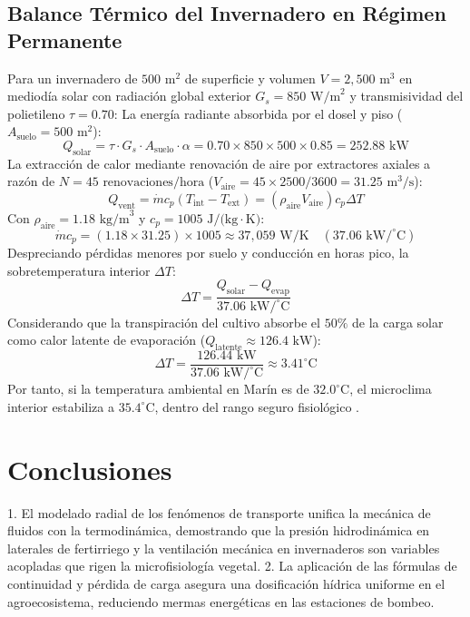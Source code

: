 \documentclass[12pt,spanish,letterpaper,oneside]{article}
\begin{document}
\subsection{Balance Térmico del Invernadero en Régimen Permanente}
Para un invernadero de $500\text{ m}^2$ de superficie y volumen $V = 2,500\text{ m}^3$ en mediodía solar con radiación global exterior $G_s = 850\text{ W/m}^2$ y transmisividad del polietileno $\tau = 0.70$:
La energía radiante absorbida por el dosel y piso ($A_{\text{suelo}} = 500\text{ m}^2$):
\begin{equation}
    Q_{\text{solar}} = \tau \cdot G_s \cdot A_{\text{suelo}} \cdot \alpha = 0.70 \times 850 \times 500 \times 0.85 = 252.88\text{ kW}
\end{equation}
La extracción de calor mediante renovación de aire por extractores axiales a razón de $N = 45\text{ renovaciones/hora}$ ($V_{\text{aire}} = 45 \times 2500 / 3600 = 31.25\text{ m}^3\text{/s}$):
\begin{equation}
    Q_{\text{vent}} = \dot{m} c_p (T_{\text{int}} - T_{\text{ext}}) = (\rho_{\text{aire}} V_{\text{aire}}) c_p \Delta T
\end{equation}
Con $\rho_{\text{aire}} = 1.18\text{ kg/m}^3$ y $c_p = 1005\text{ J/(kg}\cdot\text{K)}$:
\begin{equation}
    \dot{m} c_p = (1.18 \times 31.25) \times 1005 \approx 37,059\text{ W/K} \quad (37.06\text{ kW/}^\circ\text{C})
\end{equation}
Despreciando pérdidas menores por suelo y conducción en horas pico, la sobretemperatura interior $\Delta T$:
\begin{equation}
    \Delta T = \frac{Q_{\text{solar}} - Q_{\text{evap}}}{37.06\text{ kW/}^\circ\text{C}}
\end{equation}
Considerando que la transpiración del cultivo absorbe el $50\%$ de la carga solar como calor latente de evaporación ($Q_{\text{latente}} \approx 126.4\text{ kW}$):
\begin{equation}
    \Delta T = \frac{126.44\text{ kW}}{37.06\text{ kW/}^\circ\text{C}} \approx 3.41^\circ\text{C}
\end{equation}
Por tanto, si la temperatura ambiental en Marín es de $32.0^\circ\text{C}$, el microclima interior estabiliza a $35.4^\circ\text{C}$, dentro del rango seguro fisiológico \parencite{tipler2010}.

\section{Conclusiones}
1. El modelado radial de los fenómenos de transporte unifica la mecánica de fluidos con la termodinámica, demostrando que la presión hidrodinámica en laterales de fertirriego y la ventilación mecánica en invernaderos son variables acopladas que rigen la microfisiología vegetal.
2. La aplicación de las fórmulas de continuidad y pérdida de carga asegura una dosificación hídrica uniforme en el agroecosistema, reduciendo mermas energéticas en las estaciones de bombeo.

\newpage
\printbibliography[title={Referencias bibliográficas}]
\end{document}
